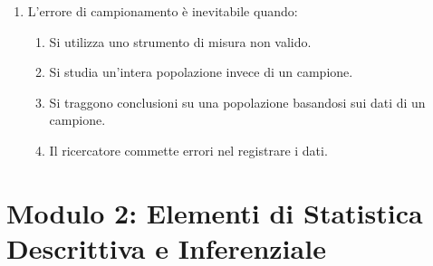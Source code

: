 \documentclass[12pt, a4paper]{article}
\begin{document}
\begin{enumerate}[resume]
    \item L'errore di campionamento è inevitabile quando:
    \begin{enumerate}
        \item Si utilizza uno strumento di misura non valido.
        \item Si studia un'intera popolazione invece di un campione.
        \item Si traggono conclusioni su una popolazione basandosi sui dati di un campione.
        \item Il ricercatore commette errori nel registrare i dati.
    \end{enumerate}
    \vspace{0.3cm}
\end{enumerate}

\section*{Modulo 2: Elementi di Statistica Descrittiva e Inferenziale}
\end{document}
